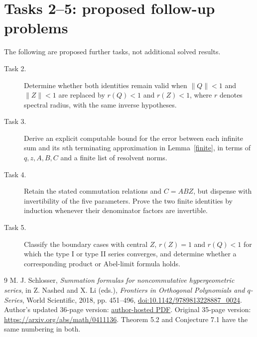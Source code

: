 \documentclass[11pt]{article}
\newcommand{\norm}[1]{\lVert#1\rVert}
\begin{document}
\section*{Tasks 2--5: proposed follow-up problems}
The following are proposed further tasks, not additional solved results.
\begin{description}
\item[Task 2.] Determine whether both identities remain valid when
$\norm Q<1$ and $\norm Z<1$ are replaced by $r(Q)<1$ and $r(Z)<1$,
where $r$ denotes spectral radius, with the same inverse hypotheses.
\item[Task 3.] Derive an explicit computable bound for the error between
each infinite sum and its $n$th terminating approximation in
Lemma~\ref{finite}, in terms of $q,z,A,B,C$ and a finite list of
resolvent norms.
\item[Task 4.] Retain the stated commutation relations and $C=ABZ$, but
dispense with invertibility of the five parameters. Prove the two finite
identities by induction whenever their denominator factors are invertible.
\item[Task 5.] Classify the boundary cases with central $Z$, $r(Z)=1$
and $r(Q)<1$ for which the type I or type II series converges, and
determine whether a corresponding product or Abel-limit formula holds.
\end{description}

\begin{thebibliography}{9}
 M. J. Schlosser,
\emph{Summation formulas for noncommutative hypergeometric series},
in Z. Nashed and X. Li (eds.),
\emph{Frontiers in Orthogonal Polynomials and $q$-Series},
World Scientific, 2018, pp. 451--496,
\href{https://doi.org/10.1142/9789813228887_0024}{doi:10.1142/9789813228887\_0024}.
Author's updated 36-page version:
\href{https://www.mat.univie.ac.at/~schlosse/pdf/noncomhyp.pdf}{author-hosted PDF}.
Original 35-page version: \url{https://arxiv.org/abs/math/0411136}.
Theorem 5.2 and Conjecture 7.1 have the same numbering in both.
\end{thebibliography}
\end{document}
